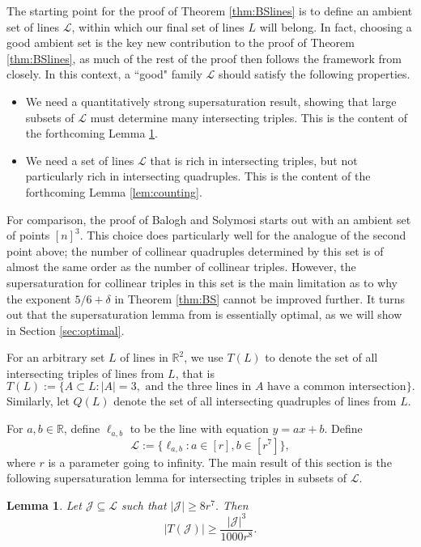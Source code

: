 \documentclass[11pt]{amsart}
\newcommand{\cL}{\mathcal{L}}
\newtheorem{lemma}{Lemma}
\theoremstyle{remark}
\begin{document}
The starting point for the proof of Theorem \ref{thm:BSlines} is to define an ambient set of lines $\mathcal L$, within which our final set of lines $L$ will belong. In fact, choosing a good ambient set is the key new contribution to the proof of Theorem \ref{thm:BSlines}, as much of the rest of the proof then follows the framework from \cite{BaSo} closely. In this context, a ``good" family $\cL$ should satisfy the following properties.
\begin{itemize}
    \item We need a quantitatively strong supersaturation result, showing that large subsets of $\cL$ must determine many intersecting triples. This is the content of the forthcoming Lemma \ref{lem:sslL}.
    \item We need a set of lines $\cL$ that is rich in intersecting triples, but not particularly rich in intersecting quadruples. This is the content of the forthcoming Lemma \ref{lem:counting}.
\end{itemize}
For comparison, the proof of Balogh and Solymosi starts out with an ambient set of points $[n]^3$. This choice does particularly well for the analogue of the second point above; the number of collinear quadruples determined by this set is of almost the same order as the number of collinear triples. However, the supersaturation for collinear triples in this set is the main limitation  as to why the exponent $5/6+\delta$ in Theorem \ref{thm:BS} cannot be improved further. It turns out that the supersaturation lemma from \cite{BaSo} is essentially optimal, as we will show in Section \ref{sec:optimal}.

For an arbitrary set $L$ of lines in $\mathbb R^2$, we use $T(L)$ to denote the set of all intersecting triples of lines from $L$, that is
\[
T(L):= \{ A \subset L : |A|=3, \text{ and the three lines in $A$ have a common intersection} \}.
\]
Similarly, let $Q(L)$ denote the set of all intersecting quadruples of lines from $L$.

For $a,b \in \mathbb R$, define $\ell_{a,b}$ to be the line with equation $y=ax+b$. Define
\begin{equation} \label{Ldefn}
\mathcal L:= \{ \ell_{a,b} : a \in [r], b \in [r^7] \},
\end{equation}
where $r$ is a parameter going to infinity. The main result of this section is the following supersaturation lemma for intersecting triples in subsets of $\cL$.

\begin{lemma} \label{lem:sslL}
Let $\mathcal J \subseteq \mathcal L$ such that $|\mathcal J| \geq 8r^7$. Then
\[
|T(\mathcal J)| \geq \frac{|\mathcal J|^3}{1000r^8}.
\]
\end{lemma}
\end{document}
